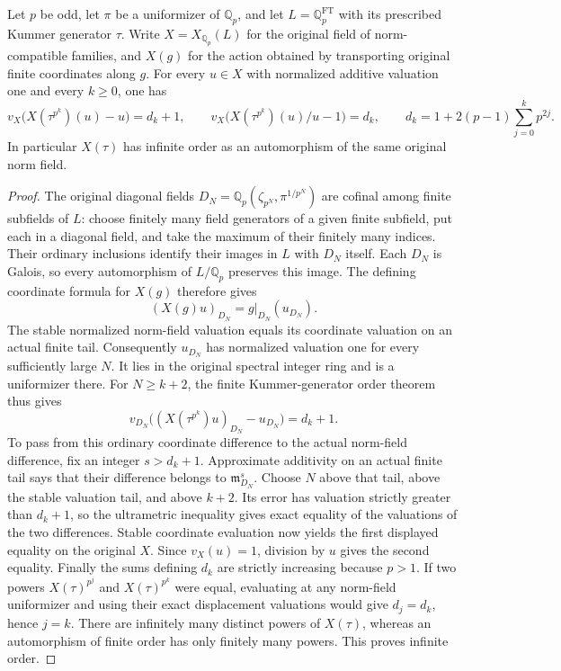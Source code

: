 \begin{proposition}
\label{ft:norm-field-kummer-displacement}
\leanok
{}
Let $p$ be odd, let $\pi$ be a uniformizer of $\mathbb Q_p$, and let
$L=\mathbb Q_p^{\mathrm{FT}}$ with its prescribed Kummer generator $\tau$.
Write $X=X_{\mathbb Q_p}(L)$ for the original field of norm-compatible
families, and $X(g)$ for the action obtained by transporting original finite
coordinates along $g$. For every $u\in X$ with normalized additive valuation
one and every $k\geq0$, one has
\[
 v_X\bigl(X(\tau^{p^k})(u)-u\bigr)=d_k+1,\qquad
 v_X\bigl(X(\tau^{p^k})(u)/u-1\bigr)=d_k,
 \qquad d_k=1+2(p-1)\sum_{j=0}^k p^{2j}.
\]
In particular $X(\tau)$ has infinite order as an automorphism of the same
original norm field.
\end{proposition}
\begin{proof}
The original diagonal fields $D_N=\mathbb Q_p(\zeta_{p^N},\pi^{1/p^N})$
are cofinal among finite subfields of $L$: choose finitely many field generators
of a given finite subfield, put each in a diagonal field, and take the maximum
of their finitely many indices. Their ordinary inclusions identify their
images in $L$ with $D_N$ itself. Each $D_N$ is Galois, so every automorphism
of $L/\mathbb Q_p$ preserves this image. The defining coordinate formula for
$X(g)$ therefore gives
\[
 (X(g)u)_{D_N}=g|_{D_N}(u_{D_N}).
\]
The stable normalized norm-field valuation equals its coordinate valuation on
an actual finite tail. Consequently $u_{D_N}$ has normalized valuation one
for every sufficiently large $N$. It lies in the original spectral integer
ring and is a uniformizer there. For $N\geq k+2$, the finite Kummer-generator
order theorem thus gives
\[
 v_{D_N}\bigl((X(\tau^{p^k})u)_{D_N}-u_{D_N}\bigr)=d_k+1.
\]
To pass from this ordinary coordinate difference to the actual norm-field
difference, fix an integer $s>d_k+1$. Approximate additivity on an actual finite
tail says that their difference belongs to $\mathfrak m_{D_N}^{s}$. Choose
$N$ above that tail, above the stable valuation tail, and above $k+2$.
Its error has valuation strictly greater than $d_k+1$, so the ultrametric
inequality gives exact equality of the valuations of the two differences.
Stable coordinate evaluation now yields the first displayed equality on the
original $X$. Since $v_X(u)=1$, division by $u$ gives the second equality.
Finally the sums defining $d_k$ are strictly increasing because $p>1$.
If two powers $X(\tau)^{p^j}$ and $X(\tau)^{p^k}$ were equal, evaluating at
any norm-field uniformizer and using their exact displacement valuations
would give $d_j=d_k$, hence $j=k$. There are infinitely many distinct powers
of $X(\tau)$, whereas an automorphism of finite order has only finitely many
powers. This proves infinite order.
\end{proof}

